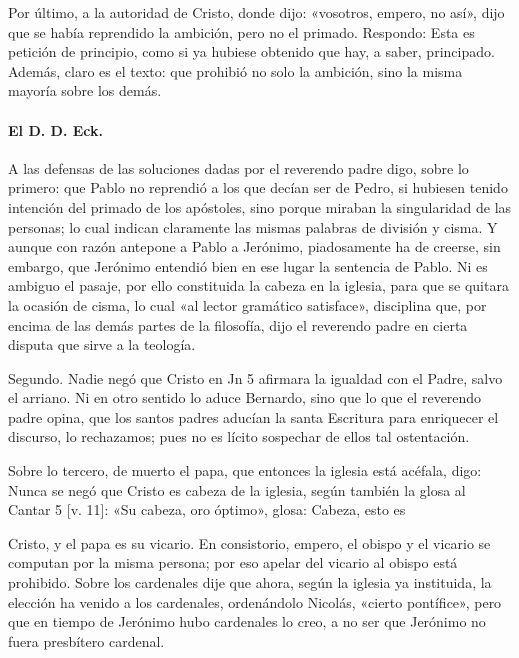 Por último, a la autoridad de Cristo, donde dijo: «vosotros, empero, no así», dijo que se había reprendido la ambición, pero no el primado. Respondo: Esta es petición de principio, como si ya hubiese obtenido que hay, a saber, principado. Además, claro es el texto: que prohibió no solo la ambición, sino la misma mayoría sobre los demás.

\paragraph*{El D. D. Eck.}

A las defensas de las soluciones dadas por el reverendo padre digo, sobre lo primero: que Pablo no reprendió a los que decían ser de Pedro, si hubiesen tenido intención del primado de los apóstoles, sino porque miraban la singularidad de las personas; lo cual indican claramente las mismas palabras de división y cisma. Y aunque con razón antepone a Pablo a Jerónimo, piadosamente ha de creerse, sin embargo, que Jerónimo entendió bien en ese lugar la sentencia de Pablo. Ni es ambiguo el pasaje, por ello constituida la cabeza en la iglesia, para que se quitara la ocasión de cisma, lo cual «al lector gramático satisface», disciplina que, por encima de las demás partes de la filosofía, dijo el reverendo padre en cierta disputa que sirve a la teología.

Segundo. Nadie negó que Cristo en Jn 5 afirmara la igualdad con el Padre, salvo el arriano. Ni en otro sentido lo aduce Bernardo, sino que lo que el reverendo padre opina, que los santos padres aducían la santa Escritura \marginpar{\small[268]} para enriquecer el discurso, lo rechazamos; pues no es lícito sospechar de ellos tal ostentación.

Sobre lo tercero, de muerto el papa, que entonces la iglesia está acéfala, digo: Nunca se negó que Cristo es cabeza de la iglesia, según también la glosa al Cantar 5 [v. 11]: «Su cabeza, oro óptimo», glosa: Cabeza, esto es

Cristo, y el papa es su vicario. En consistorio, empero, el obispo y el vicario se computan por la misma persona; por eso apelar del vicario al obispo está prohibido. Sobre los cardenales dije que ahora, según la iglesia ya instituida, la elección ha venido a los cardenales, ordenándolo Nicolás, «cierto pontífice», pero que en tiempo de Jerónimo hubo cardenales lo creo, a no ser que Jerónimo no fuera presbítero cardenal.

